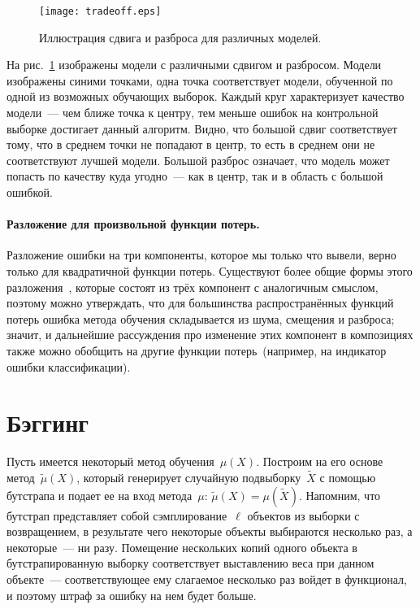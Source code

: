 \documentclass[12pt,fleqn]{article}
\begin{document}
\begin{figure}[t]
    \centering
    \texttt{[image: tradeoff.eps]}
    \caption{Иллюстрация сдвига и разброса для различных моделей.}
    \label{fig:tradeoff}
\end{figure}

На рис.~\ref{fig:tradeoff} изображены модели с различными сдвигом и разбросом.
Модели изображены синими точками, одна точка соответствует модели,
обученной по одной из возможных обучающих выборок.
Каждый круг характеризует качество модели~--- чем ближе точка к центру,
тем меньше ошибок на контрольной выборке достигает данный алгоритм.
Видно, что большой сдвиг соответствует тому, что в среднем точки не попадают в центр,
то есть в среднем они не соответствуют лучшей модели.
Большой разброс означает, что модель может попасть по качеству куда угодно~---
как в центр, так и в область с большой ошибкой.

\paragraph{Разложение для произвольной функции потерь.}
Разложение ошибки на три компоненты, которое мы только что вывели, верно
только для квадратичной функции потерь.
Существуют более общие формы этого разложения~\cite{domingos00unified},
которые состоят из трёх компонент с аналогичным смыслом,
поэтому можно утверждать, что для большинства распространённых функций потерь
ошибка метода обучения складывается из шума, смещения и разброса;
значит, и дальнейшие рассуждения про изменение этих компонент в композициях
также можно обобщить на другие функции потерь~(например, на индикатор ошибки классификации).

\section{Бэггинг}
Пусть имеется некоторый метод обучения~$\mu(X)$.
Построим на его основе метод~$\tilde \mu(X)$, который
генерирует случайную подвыборку~$\tilde X$ с помощью бутстрапа
и подает ее на вход метода~$\mu$: $\tilde \mu(X) = \mu(\tilde X)$.
Напомним, что бутстрап представляет собой сэмплирование~$\ell$ объектов из выборки
с возвращением, в результате чего некоторые объекты выбираются несколько
раз, а некоторые~--- ни разу.
Помещение нескольких копий одного объекта в бутстрапированную выборку
соответствует выставлению веса при данном объекте~--- соответствующее ему
слагаемое несколько раз войдет в функционал, и поэтому штраф
за ошибку на нем будет больше.
\end{document}

